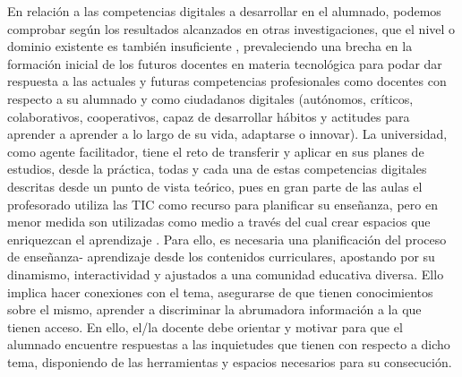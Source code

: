 \documentclass[spanish]{textolivre}
\begin{document}
En relación a las competencias digitales a desarrollar en el alumnado, podemos comprobar según los resultados alcanzados en otras investigaciones, que el nivel o dominio existente es también insuficiente \cite{fernandez-marquez2018, giron2019, paredes2015, sancho-gil2015, sierra_llorente2018, fardoun2020, cao2020, ordonez2021, romero-tena2021} %
, prevaleciendo una brecha en la formación inicial de los futuros docentes en materia tecnológica para podar dar respuesta a las actuales y futuras competencias profesionales como docentes con respecto a su alumnado y como ciudadanos digitales (autónomos, críticos, colaborativos, cooperativos, capaz de desarrollar hábitos y actitudes para aprender a aprender a lo largo de su vida, adaptarse o innovar). La universidad, como agente facilitador, tiene el reto de transferir y aplicar en sus planes de estudios, desde la práctica, todas y cada una de estas competencias digitales descritas desde un punto de vista teórico, pues en gran parte de las aulas el profesorado utiliza las TIC como recurso para planificar su enseñanza, pero en menor medida son utilizadas como medio a través del cual crear espacios que enriquezcan el aprendizaje \cite{almerich2011}. Para ello, es necesaria una planificación del proceso de enseñanza- aprendizaje desde los contenidos curriculares, apostando por su dinamismo, interactividad y ajustados a una comunidad educativa diversa. Ello implica hacer conexiones con el tema, asegurarse de que tienen conocimientos sobre el mismo, aprender a discriminar la abrumadora información a la que tienen acceso. En ello, el/la docente debe orientar y motivar para que el alumnado encuentre respuestas a las inquietudes que tienen con respecto a dicho tema, disponiendo de las herramientas y espacios necesarios para su consecución.
\end{document}
